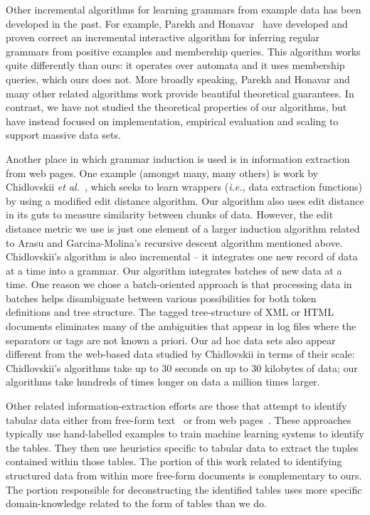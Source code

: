 Other incremental algorithms for learning grammars from example data
has been developed in the past.  For example, Parekh and 
Honavar~\cite{parekh+:incremental} have developed and proven correct
an incremental interactive algorithm for inferring
regular grammars from positive examples and membership queries.
This algorithm works quite differently than ours:  it operates over
automata and it uses membership queries, which ours does not.
More broadly speaking, Parekh and Honavar and many other related algorithms
work provide beautiful theoretical guarantees.  In contrast, we have
not studied the theoretical properties of our algorithms, but have
instead focused on implementation, empirical 
evaluation and scaling to support massive data sets.

Another place in which grammar induction is used is in information
extraction from web pages.  One example (amongst many, many others) is
work by Chidlovskii {\em et al.}~\cite{chidlovskii+:wrapper-generation},
which seeks to learn wrappers ({\em i.e.,} data extraction functions)
by using a modified edit distance algorithm.  Our algorithm also
uses edit distance in its guts to measure similarity
between chunks of data.  However, the edit distance metric we use is just
one element of a larger induction algorithm related to Arasu and
Garcina-Molina's recursive descent algorithm mentioned above.
Chidlovskii's algorithm is also incremental -- it
integrates one new record of data at a time into a grammar.
Our algorithm integrates batches of new data at a time.  One
reason we chose a batch-oriented approach is that processing
data in batches helps
disambiguate between various possibilities for both token
definitions and tree structure.  The tagged tree-structure of
XML or HTML documents eliminates many of the ambiguities that
appear in log files where the separators or tags are not known
a priori.  Our ad hoc data sets also appear different
from the web-based data studied by Chidlovskii in terms of their
scale:  Chidlovskii's algorithms take up to
30 seconds on up to 30 kilobytes of data; our algorithms 
take hundreds of times longer on data a million times larger.

Other related information-extraction efforts
are those that attempt to identify tabular data 
either from free-form text~\cite{Ng+:texttables,Pinto+:texttables} or
from web pages~\cite{Lerman+:webtables}.  These approaches typically
use hand-labelled examples to train machine learning systems to
identify the tables.  They then use heuristics specific to tabular
data to extract the tuples contained within those tables.  The portion
of this work related to identifying structured data from within more
free-form documents is complementary to ours.  The portion responsible
for deconstructing the identified tables uses more specific
domain-knowledge related to the form of tables than we do.

